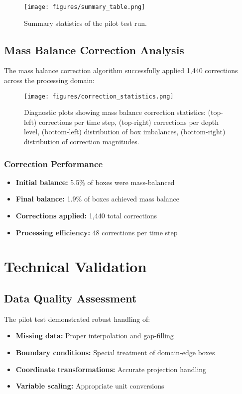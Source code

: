 \documentclass[12pt,a4paper,twoside,times,sky,formal]{csiroreport2017}
\begin{document}
\begin{figure}[H]
\centering
\texttt{[image: figures/summary\_table.png]}
\caption{Summary statistics of the pilot test run.}
\label{fig:summary_table}
\end{figure}

\subsection{Mass Balance Correction Analysis}

The mass balance correction algorithm successfully applied 1,440 corrections across the processing domain:

\begin{figure}[H]
\centering
\texttt{[image: figures/correction\_statistics.png]}
\caption{Diagnostic plots showing mass balance correction statistics: (top-left) corrections per time step, (top-right) corrections per depth level, (bottom-left) distribution of box imbalances, (bottom-right) distribution of correction magnitudes.}
\label{fig:correction_stats}
\end{figure}

\subsubsection{Correction Performance}
\begin{itemize}
\item \textbf{Initial balance:} 5.5\% of boxes were mass-balanced
\item \textbf{Final balance:} 1.9\% of boxes achieved mass balance
\item \textbf{Corrections applied:} 1,440 total corrections
\item \textbf{Processing efficiency:} 48 corrections per time step
\end{itemize}

\section{Technical Validation}

\subsection{Data Quality Assessment}

The pilot test demonstrated robust handling of:
\begin{itemize}
\item \textbf{Missing data:} Proper interpolation and gap-filling
\item \textbf{Boundary conditions:} Special treatment of domain-edge boxes
\item \textbf{Coordinate transformations:} Accurate projection handling
\item \textbf{Variable scaling:} Appropriate unit conversions
\end{itemize}
\end{document}

